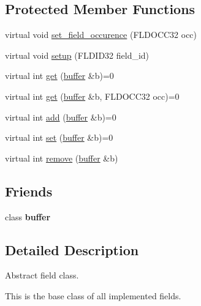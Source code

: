 \subsection*{Protected Member Functions}
\begin{DoxyCompactItemize}
\item 
virtual void \hyperlink{classatmi_1_1field_a83412cd9df383c342b5feb195090c9d9}{set\+\_\+field\+\_\+occurence} (F\+L\+D\+O\+C\+C32 occ)
\item 
virtual void \hyperlink{classatmi_1_1field_a9ca5e61e3e1068770098d20ad1332f24}{setup} (F\+L\+D\+I\+D32 field\+\_\+id)
\item 
virtual int \hyperlink{classatmi_1_1field_aae2d3df756e816b5db8f729039a59a51}{get} (\hyperlink{classatmi_1_1buffer}{buffer} \&b)=0
\item 
virtual int \hyperlink{classatmi_1_1field_a56ce53fabe290b94463f87936515ec46}{get} (\hyperlink{classatmi_1_1buffer}{buffer} \&b, F\+L\+D\+O\+C\+C32 occ)=0
\item 
virtual int \hyperlink{classatmi_1_1field_a5441bc87ba4bc3e9eb37c6db6a29688f}{add} (\hyperlink{classatmi_1_1buffer}{buffer} \&b)=0
\item 
virtual int \hyperlink{classatmi_1_1field_a41bb209965d627d2e67c839bece5372c}{set} (\hyperlink{classatmi_1_1buffer}{buffer} \&b)=0
\item 
virtual int \hyperlink{classatmi_1_1field_a783484fe641f66f5773f9eed7fd4be39}{remove} (\hyperlink{classatmi_1_1buffer}{buffer} \&b)
\end{DoxyCompactItemize}
\subsection*{Friends}
\begin{DoxyCompactItemize}
\item 
\hypertarget{classatmi_1_1field_afecbc2840248040e50fecb7164f912a9}{class {\bfseries buffer}}\label{classatmi_1_1field_afecbc2840248040e50fecb7164f912a9}

\end{DoxyCompactItemize}


\subsection{Detailed Description}
Abstract field class.

This is the base class of all implemented fields. 

